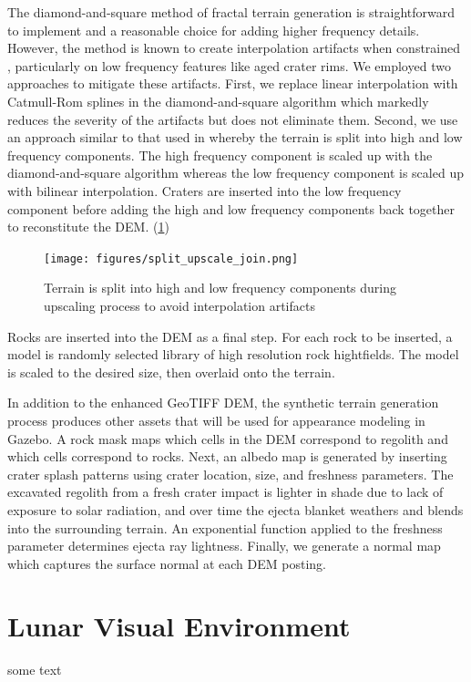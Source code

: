 \documentclass[twocolumn,letterpaper]{IEEEAerospaceCLS}  %
\begin{document}
The diamond-and-square method of fractal terrain generation is straightforward to implement and a reasonable choice for adding higher frequency details. 
However, the method is known to create interpolation artifacts when constrained \cite{miller1986definition}, particularly on low frequency features like aged crater rims. 
We employed two approaches to mitigate these artifacts. 
First, we replace linear interpolation with Catmull-Rom splines in the diamond-and-square algorithm which markedly reduces the severity of the artifacts but does not eliminate them.
Second, we use an approach similar to that used in \cite{shankar2008lunar} whereby the terrain is split into high and low frequency components.
The high frequency component is scaled up with the diamond-and-square algorithm whereas the low frequency component is scaled up with bilinear interpolation. 
Craters are inserted into the low frequency component before adding the high and low frequency components back together to reconstitute the DEM. (\cref{fig:split_upscale_join})

\begin{figure}[h!]
  \texttt{[image: figures/split\_upscale\_join.png]}
    \caption{Terrain is split into high and low frequency components during upscaling process to avoid interpolation artifacts}
    \label{fig:split_upscale_join}
\end{figure}

Rocks are inserted into the DEM as a final step. For each rock to be inserted, a model is randomly selected library of high resolution rock hightfields. The model is scaled to the desired size, then overlaid onto the terrain.

In addition to the enhanced GeoTIFF DEM, the synthetic terrain generation process produces other assets that will be used for appearance modeling in Gazebo. 
A rock mask maps which cells in the DEM correspond to regolith and which cells correspond to rocks. 
Next, an albedo map is generated by inserting crater splash patterns using crater location, size, and freshness parameters. 
The excavated regolith from a fresh crater impact is lighter in shade due to lack of exposure to solar radiation, and over time the ejecta blanket weathers and blends into the surrounding terrain. 
An exponential function applied to the freshness parameter determines ejecta ray lightness. 
Finally, we generate a normal map which captures the surface normal at each DEM posting. 


\section{Lunar Visual Environment}
some text
\end{document}
